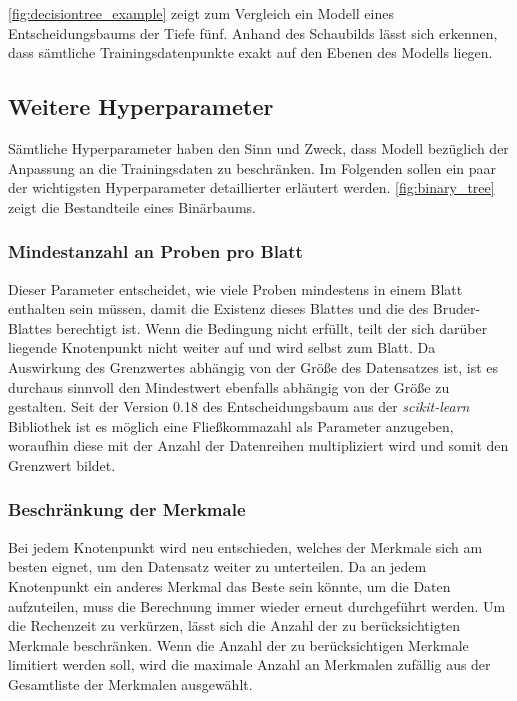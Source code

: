 \documentclass[12pt, a4paper]{article}
\begin{document}
\autoref{fig:decisiontree_example} zeigt zum Vergleich ein Modell eines Entscheidungsbaums der Tiefe fünf. Anhand des Schaubilds lässt sich erkennen, dass sämtliche Trainingsdatenpunkte exakt auf den Ebenen des Modells liegen. 

\subsection{Weitere Hyperparameter}

Sämtliche Hyperparameter haben den Sinn und Zweck, dass Modell bezüglich der Anpassung an die Trainingsdaten zu beschränken. Im Folgenden sollen ein paar der wichtigsten Hyperparameter detaillierter erläutert werden. \autoref{fig:binary_tree} zeigt die Bestandteile eines Binärbaums.

\subsubsection{Mindestanzahl an Proben pro Blatt} 

Dieser Parameter entscheidet, wie viele Proben mindestens in einem Blatt enthalten sein müssen, damit die Existenz dieses Blattes und die des Bruder-Blattes berechtigt ist. Wenn die Bedingung nicht erfüllt, teilt der sich darüber liegende Knotenpunkt nicht weiter auf und wird selbst zum Blatt. Da Auswirkung des Grenzwertes abhängig von der Größe des Datensatzes ist, ist es durchaus sinnvoll den Mindestwert ebenfalls abhängig von der Größe zu gestalten. Seit der Version 0.18 des Entscheidungsbaum aus der \textit{scikit-learn} Bibliothek ist es möglich eine Fließkommazahl als Parameter anzugeben, woraufhin diese mit der Anzahl der Datenreihen multipliziert wird und somit den Grenzwert bildet.

\subsubsection{Beschränkung der Merkmale}

Bei jedem Knotenpunkt wird neu entschieden, welches der Merkmale sich am besten eignet, um den Datensatz weiter zu unterteilen. Da an jedem Knotenpunkt ein anderes Merkmal das Beste sein könnte, um die Daten aufzuteilen, muss die Berechnung immer wieder erneut durchgeführt werden. Um die Rechenzeit zu verkürzen, lässt sich die Anzahl der zu berücksichtigten Merkmale beschränken. Wenn die Anzahl der zu berücksichtigen Merkmale limitiert werden soll, wird die maximale Anzahl an Merkmalen zufällig aus der Gesamtliste der Merkmalen ausgewählt. 
\end{document}
